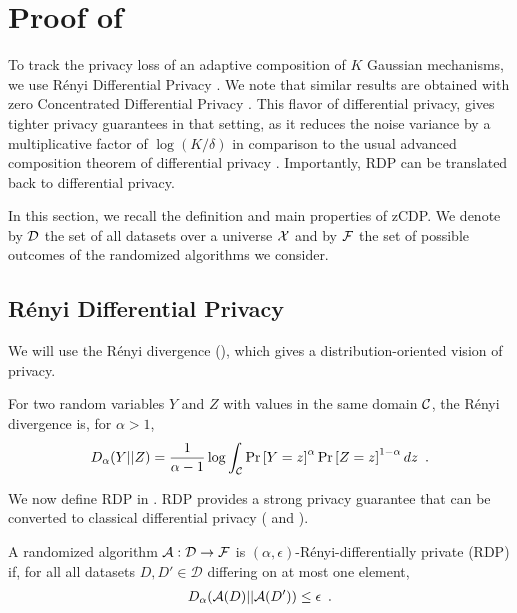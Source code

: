 

\section{Proof of }
\label{sec:proof-privacy}


To track the privacy loss of an adaptive composition of $K$ Gaussian
mechanisms, we use Rényi Differential Privacy
\citep[RDP]{mironov2017Renyi}. We note that similar results are
obtained with zero Concentrated Differential Privacy
\citep{bun2016Concentrated}. This flavor of differential privacy,
gives tighter privacy guarantees in that setting, as it reduces the
noise variance by a multiplicative factor of $\log(K/\delta)$ in
comparison to the usual advanced composition theorem of differential
privacy \citep{dwork2006Calibrating}.  Importantly, RDP can be
translated back to differential privacy.

In this section, we recall the definition and main properties of zCDP.
We denote by $\mathcal D$ the set of all datasets over a universe $\mathcal X$
and by $\mathcal F$ the set of possible outcomes of the randomized
algorithms we consider.

\subsection{Rényi Differential Privacy}

We will use the Rényi divergence (), which gives
a distribution-oriented vision of privacy.

\begin{definition}
  \label{def:renyi-div}
  For two random variables $Y$ and $Z$ with values in the same domain $\mathcal C$,
  the Rényi divergence is, for $\alpha > 1$,
  \begin{align}
    D_\alpha(Y||Z)
    = \frac{1}{\alpha - 1} \log \int_{\mathcal C} \textnormal{Pr} \left[ Y=z \right]^\alpha \textnormal{Pr} \left[ Z=z \right]^{1 - \alpha} dz\enspace.
  \end{align}
\end{definition}



We now define RDP in . RDP provides a strong privacy
guarantee that can be converted to classical differential privacy
( and ).

\begin{definition}
  \label{def:rdp}
  A randomized algorithm $\mathcal A : \mathcal D \rightarrow \mathcal F$ is
  $(\alpha, \epsilon)$-Rényi-differentially private (RDP) if, for all
  all datasets $D, D' \in \mathcal D$ differing on at most one
  element,
  \begin{align}
    D_\alpha(\mathcal A(D) || \mathcal A(D')) \le \epsilon\enspace.
  \end{align}
\end{definition}

